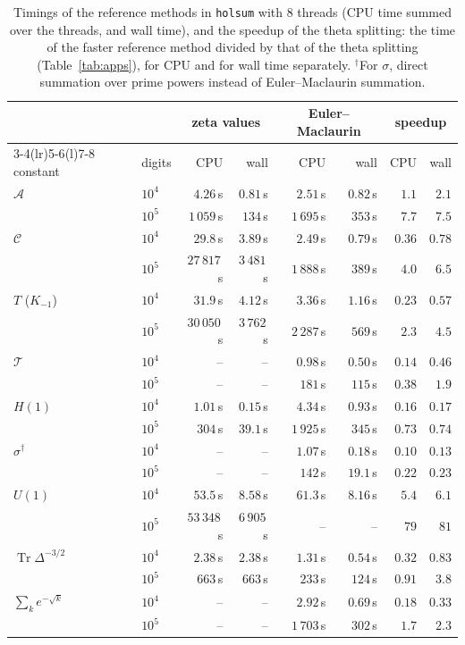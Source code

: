 \documentclass[11pt,reqno]{amsart}
\theoremstyle{definition}
\theoremstyle{remark}
\begin{document}
\begin{table}[tp]
\centering\small
\caption{Timings of the reference methods in \texttt{holsum} with $8$ threads (CPU time summed over the threads, and
wall time), and the speedup of the theta splitting: the time of the faster reference method divided by that of the
theta splitting (Table~\ref{tab:apps}), for CPU and for wall time separately. ${}^\dagger$For $\sigma$, direct
summation over prime powers instead of Euler--Maclaurin summation.}
\label{tab:appsref}
\begin{tabular}{llrrrrrr}
\toprule
& & \multicolumn{2}{c}{zeta values} & \multicolumn{2}{c}{Euler--Maclaurin} & \multicolumn{2}{c}{speedup} \\
\cmidrule(lr){3-4}\cmidrule(lr){5-6}\cmidrule(l){7-8}
constant & digits & CPU & wall & CPU & wall & CPU & wall \\
\midrule
$\mathcal A$ & $10^4$ & $4.26$\,s & $0.81$\,s & $2.51$\,s & $0.82$\,s & $1.1$ & $2.1$ \\
 & $10^5$ & $1\,059$\,s & $134$\,s & $1\,695$\,s & $353$\,s & $7.7$ & $7.5$ \\
\midrule
$\mathcal C$ & $10^4$ & $29.8$\,s & $3.89$\,s & $2.49$\,s & $0.79$\,s & $0.36$ & $0.78$ \\
 & $10^5$ & $27\,817$\,s & $3\,481$\,s & $1\,888$\,s & $389$\,s & $4.0$ & $6.5$ \\
\midrule
$T$ ($K_{-1}$) & $10^4$ & $31.9$\,s & $4.12$\,s & $3.36$\,s & $1.16$\,s & $0.23$ & $0.57$ \\
 & $10^5$ & $30\,050$\,s & $3\,762$\,s & $2\,287$\,s & $569$\,s & $2.3$ & $4.5$ \\
\midrule
$\mathcal T$ & $10^4$ & -- & -- & $0.98$\,s & $0.50$\,s & $0.14$ & $0.46$ \\
 & $10^5$ & -- & -- & $181$\,s & $115$\,s & $0.38$ & $1.9$ \\
\midrule
$H(1)$ & $10^4$ & $1.01$\,s & $0.15$\,s & $4.34$\,s & $0.93$\,s & $0.16$ & $0.17$ \\
 & $10^5$ & $304$\,s & $39.1$\,s & $1\,925$\,s & $345$\,s & $0.73$ & $0.74$ \\
\midrule
$\sigma^\dagger$ & $10^4$ & -- & -- & $1.07$\,s & $0.18$\,s & $0.10$ & $0.13$ \\
 & $10^5$ & -- & -- & $142$\,s & $19.1$\,s & $0.22$ & $0.23$ \\
\midrule
$U(1)$ & $10^4$ & $53.5$\,s & $8.58$\,s & $61.3$\,s & $8.16$\,s & $5.4$ & $6.1$ \\
 & $10^5$ & $53\,348$\,s & $6\,905$\,s & -- & -- & $79$ & $81$ \\
\midrule
$\operatorname{Tr}\Delta^{-3/2}$ & $10^4$ & $2.38$\,s & $2.38$\,s & $1.31$\,s & $0.54$\,s & $0.32$ & $0.83$ \\
 & $10^5$ & $663$\,s & $663$\,s & $233$\,s & $124$\,s & $0.91$ & $3.8$ \\
\midrule
$\sum_ke^{-\sqrt k}$ & $10^4$ & -- & -- & $2.92$\,s & $0.69$\,s & $0.18$ & $0.33$ \\
 & $10^5$ & -- & -- & $1\,703$\,s & $302$\,s & $1.7$ & $2.3$ \\
\bottomrule
\end{tabular}
\end{table}
\end{document}
